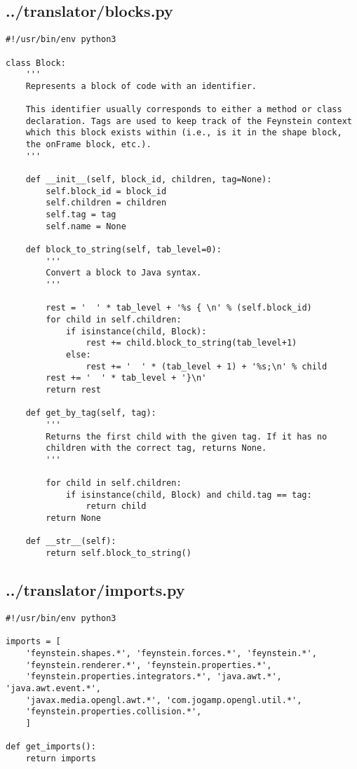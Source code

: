 \subsection*{../translator/blocks.py}
\begin{lstlisting}
#!/usr/bin/env python3

class Block:
    '''
    Represents a block of code with an identifier. 

    This identifier usually corresponds to either a method or class
    declaration. Tags are used to keep track of the Feynstein context
    which this block exists within (i.e., is it in the shape block,
    the onFrame block, etc.).
    '''

    def __init__(self, block_id, children, tag=None):
        self.block_id = block_id
        self.children = children
        self.tag = tag
        self.name = None

    def block_to_string(self, tab_level=0):
        '''
        Convert a block to Java syntax.
        '''

        rest = '  ' * tab_level + '%s { \n' % (self.block_id)
        for child in self.children:
            if isinstance(child, Block):
                rest += child.block_to_string(tab_level+1)
            else:
                rest += '  ' * (tab_level + 1) + '%s;\n' % child
        rest += '  ' * tab_level + '}\n'
        return rest

    def get_by_tag(self, tag):
        '''
        Returns the first child with the given tag. If it has no
        children with the correct tag, returns None.
        '''

        for child in self.children:
            if isinstance(child, Block) and child.tag == tag: 
                return child
        return None

    def __str__(self):
        return self.block_to_string()
\end{lstlisting}

\subsection*{../translator/imports.py}
\begin{lstlisting}
#!/usr/bin/env python3

imports = [
    'feynstein.shapes.*', 'feynstein.forces.*', 'feynstein.*',
    'feynstein.renderer.*', 'feynstein.properties.*', 
    'feynstein.properties.integrators.*', 'java.awt.*', 'java.awt.event.*',
    'javax.media.opengl.awt.*', 'com.jogamp.opengl.util.*', 
    'feynstein.properties.collision.*',
    ]

def get_imports():
    return imports
\end{lstlisting}

